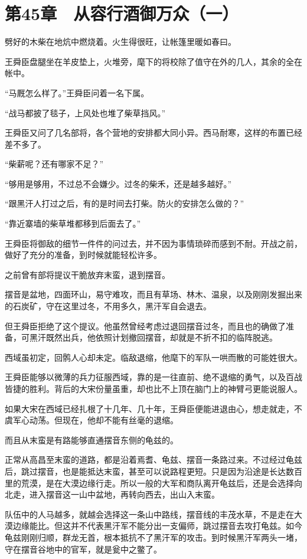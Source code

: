 \section{第45章　从容行酒御万众（一）}

劈好的木柴在地炕中燃烧着。火生得很旺，让帐篷里暖如春曰。

王舜臣盘腿坐在羊皮垫上，火堆旁，麾下的将校除了值守在外的几人，其余的全在帐中。

“马厩怎么样了。”王舜臣问着一名下属。

“战马都披了毯子，上风处也堆了柴草挡风。”

王舜臣又问了几名部将，各个营地的安排都大同小异。西马耐寒，这样的布置已经差不多了。

“柴薪呢？还有哪家不足？”

“够用是够用，不过总不会嫌少。过冬的柴禾，还是越多越好。”

“跟黑汗人打过之后，有的是时间去打柴。防火的安排怎么做的？”

“靠近寨墙的柴草堆都移到后面去了。”

王舜臣将御敌的细节一件件的问过去，并不因为事情琐碎而感到不耐。开战之前，做好了充分的准备，到时候就能轻松许多。

之前曾有部将提议干脆放弃末蛮，退到摆音。

摆音是盆地，四面环山，易守难攻，而且有草场、林木、温泉，以及刚刚发掘出来的石炭矿，守在这里过冬，不用多久，黑汗军自会退去。

但王舜臣拒绝了这个提议。他虽然曾经考虑过退回摆音过冬，而且也的确做了准备，可黑汗既然出兵，他依照计划撤回摆音，却就是不折不扣的临阵脱逃。

西域虽初定，回鹘人心却未定。临敌退缩，他麾下的军队一哄而散的可能姓很大。

王舜臣能够以微薄的兵力征服西域，靠的是一往直前、绝不退缩的勇气，以及百战皆捷的胜利。背后的大宋份量虽重，却也比不上顶在脑门上的神臂弓更能说服人。

如果大宋在西域已经扎根了十几年、几十年，王舜臣便能进退由心，想走就走，不虞军心动荡。但现在，他却不能有丝毫的退缩。

而且从末蛮是有路能够直通摆音东侧的龟兹的。

正常从高昌至末蛮的道路，都是沿着焉耆、龟兹、摆音一条路过来。不过经过龟兹后，跳过摆音，也是能抵达末蛮，甚至可以说路程更短。只是因为沿途是长达数百里的荒漠，是在大漠边缘行走。所以一般的大军和商队离开龟兹后，还是会选择向北走，进入摆音这一山中盆地，再转向西去，出山入末蛮。

队伍中的人马越多，就越会选择这一条山中路线，摆音线的丰茂水草，不是走在大漠边缘能比。但这并不代表黑汗军不能分出一支偏师，跳过摆音去攻打龟兹。如今龟兹刚刚归顺，群龙无首，根本抵抗不了黑汗军的攻击。到时候黑汗军两头一堵，守在摆音谷地中的官军，就是瓮中之鳖了。

